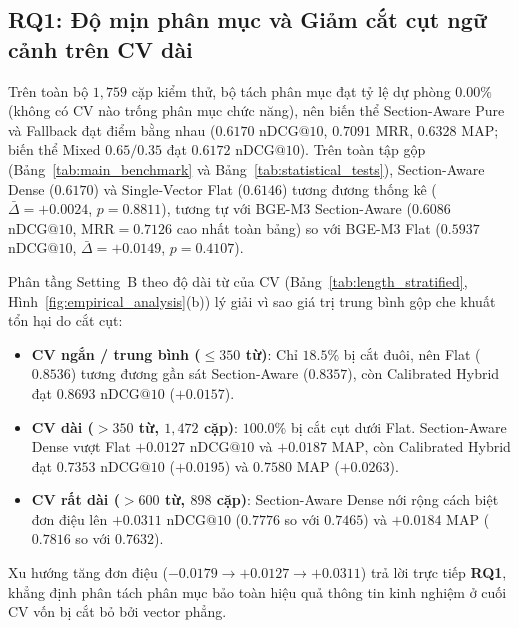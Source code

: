 \subsection{RQ1: Độ mịn phân mục và Giảm cắt cụt ngữ cảnh trên CV dài}
\label{sec:rq1}
Trên toàn bộ $1{,}759$ cặp kiểm thử, bộ tách phân mục đạt tỷ lệ dự phòng $\mathbf{0.00\%}$ (không có CV nào trống phân mục chức năng), nên biến thể Section-Aware Pure và Fallback đạt điểm bằng nhau ($0.6170$ $\text{nDCG}@10$, $0.7091$ $\text{MRR}$, $0.6328$ $\text{MAP}$; biến thể Mixed $0.65/0.35$ đạt $0.6172$ $\text{nDCG}@10$). Trên toàn tập gộp (Bảng~\ref{tab:main_benchmark} và Bảng~\ref{tab:statistical_tests}), Section-Aware Dense ($0.6170$) và Single-Vector Flat ($0.6146$) tương đương thống kê ($\bar{\Delta}=+0.0024$, $p=0.8811$), tương tự với BGE-M3 Section-Aware ($0.6086$ $\text{nDCG}@10$, $\text{MRR}=0.7126$ cao nhất toàn bảng) so với BGE-M3 Flat ($0.5937$ $\text{nDCG}@10$, $\bar{\Delta}=+0.0149$, $p=0.4107$).



Phân tầng Setting~B theo độ dài từ của CV (Bảng~\ref{tab:length_stratified}, Hình~\ref{fig:empirical_analysis}(b)) lý giải vì sao giá trị trung bình gộp che khuất tổn hại do cắt cụt:
\begin{itemize}
    \item \textbf{CV ngắn / trung bình ($\le 350$ từ)}: Chỉ $18.5\%$ bị cắt đuôi, nên Flat ($0.8536$) tương đương gần sát Section-Aware ($0.8357$), còn Calibrated Hybrid đạt $\mathbf{0.8693}$ $\text{nDCG}@10$ ($+0.0157$).
    \item \textbf{CV dài ($> 350$ từ, $1{,}472$ cặp)}: $100.0\%$ bị cắt cụt dưới Flat. Section-Aware Dense vượt Flat $+0.0127$ $\text{nDCG}@10$ và $+0.0187$ $\text{MAP}$, còn Calibrated Hybrid đạt $\mathbf{0.7353}$ $\text{nDCG}@10$ ($\mathbf{+0.0195}$) và $\mathbf{0.7580}$ $\text{MAP}$ ($\mathbf{+0.0263}$).
    \item \textbf{CV rất dài ($> 600$ từ, $898$ cặp)}: Section-Aware Dense nới rộng cách biệt đơn điệu lên $\mathbf{+0.0311}$ $\text{nDCG}@10$ ($0.7776$ so với $0.7465$) và $+0.0184$ $\text{MAP}$ ($0.7816$ so với $0.7632$).
\end{itemize}
Xu hướng tăng đơn điệu ($-0.0179 \rightarrow +0.0127 \rightarrow +0.0311$) trả lời trực tiếp \textbf{RQ1}, khẳng định phân tách phân mục bảo toàn hiệu quả thông tin kinh nghiệm ở cuối CV vốn bị cắt bỏ bởi vector phẳng.


